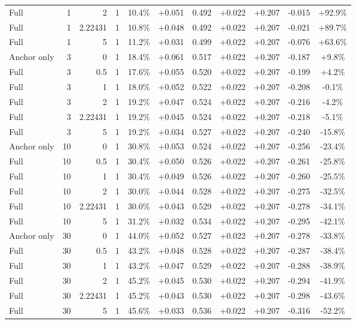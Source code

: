 \begin{table}[htbp]
\begin{tabular}{lrrrccccccc}
Full & 1 & 2 & 1 & 10.4\% & +0.051 & 0.492 & +0.022 & +0.207 & -0.015 & +92.9\% \\
Full & 1 & 2.22431 & 1 & 10.8\% & +0.048 & 0.492 & +0.022 & +0.207 & -0.021 & +89.7\% \\
Full & 1 & 5 & 1 & 11.2\% & +0.031 & 0.499 & +0.022 & +0.207 & -0.076 & +63.6\% \\
Anchor only & 3 & 0 & 1 & 18.4\% & +0.061 & 0.517 & +0.022 & +0.207 & -0.187 & +9.8\% \\
Full & 3 & 0.5 & 1 & 17.6\% & +0.055 & 0.520 & +0.022 & +0.207 & -0.199 & +4.2\% \\
Full & 3 & 1 & 1 & 18.0\% & +0.052 & 0.522 & +0.022 & +0.207 & -0.208 & -0.1\% \\
Full & 3 & 2 & 1 & 19.2\% & +0.047 & 0.524 & +0.022 & +0.207 & -0.216 & -4.2\% \\
Full & 3 & 2.22431 & 1 & 19.2\% & +0.045 & 0.524 & +0.022 & +0.207 & -0.218 & -5.1\% \\
Full & 3 & 5 & 1 & 19.2\% & +0.034 & 0.527 & +0.022 & +0.207 & -0.240 & -15.8\% \\
Anchor only & 10 & 0 & 1 & 30.8\% & +0.053 & 0.524 & +0.022 & +0.207 & -0.256 & -23.4\% \\
Full & 10 & 0.5 & 1 & 30.4\% & +0.050 & 0.526 & +0.022 & +0.207 & -0.261 & -25.8\% \\
Full & 10 & 1 & 1 & 30.4\% & +0.049 & 0.526 & +0.022 & +0.207 & -0.260 & -25.5\% \\
Full & 10 & 2 & 1 & 30.0\% & +0.044 & 0.528 & +0.022 & +0.207 & -0.275 & -32.5\% \\
Full & 10 & 2.22431 & 1 & 30.0\% & +0.043 & 0.529 & +0.022 & +0.207 & -0.278 & -34.1\% \\
Full & 10 & 5 & 1 & 31.2\% & +0.032 & 0.534 & +0.022 & +0.207 & -0.295 & -42.1\% \\
Anchor only & 30 & 0 & 1 & 44.0\% & +0.052 & 0.527 & +0.022 & +0.207 & -0.278 & -33.8\% \\
Full & 30 & 0.5 & 1 & 43.2\% & +0.048 & 0.528 & +0.022 & +0.207 & -0.287 & -38.4\% \\
Full & 30 & 1 & 1 & 43.2\% & +0.047 & 0.529 & +0.022 & +0.207 & -0.288 & -38.9\% \\
Full & 30 & 2 & 1 & 45.2\% & +0.045 & 0.530 & +0.022 & +0.207 & -0.294 & -41.9\% \\
Full & 30 & 2.22431 & 1 & 45.2\% & +0.043 & 0.530 & +0.022 & +0.207 & -0.298 & -43.6\% \\
Full & 30 & 5 & 1 & 45.6\% & +0.033 & 0.536 & +0.022 & +0.207 & -0.316 & -52.2\% \\

\end{tabular}
\end{table}
